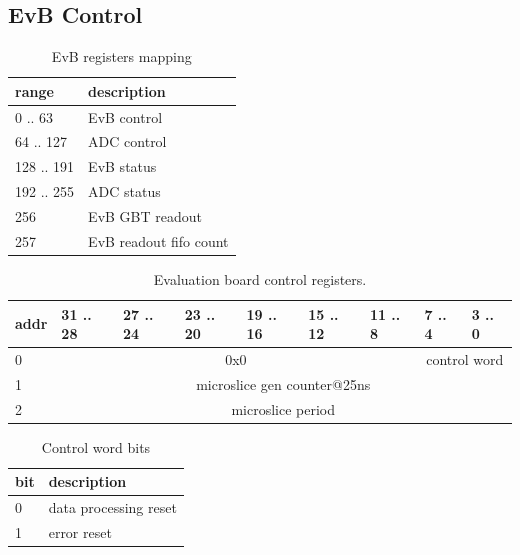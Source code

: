 \documentclass{article}
\begin{document}
\subsection{EvB Control}

\begin{table}[H]
\centering
\begin{tabular}{| l | l |}
\hline
range & description \\ \hline
0 .. 63 & EvB control \\ \hline
64 .. 127 & ADC control \\ \hline
128 .. 191 & EvB status \\ \hline
192 .. 255 & ADC status \\ \hline
256 & EvB GBT readout \\ \hline
257 & EvB readout fifo count \\ \hline
\end{tabular}
\caption{EvB registers mapping\label{tab6}}
\end{table}

\begin{table}[H]
\centering
\begin{tabular}{| l | l | l | l | l | l | l | l | l |}
\hline
addr & 31 .. 28 & 27 .. 24 & 23 .. 20 & 19 .. 16 & 15 .. 12 & 11 .. 8 & 7 .. 4 & 3 .. 0 \\ \hline
0 & \multicolumn{6}{c|}{0x0}  & \multicolumn{2}{c|}{control word} \\ \hline
1 & \multicolumn{8}{c|}{microslice gen counter@25ns}  \\ \hline
2 & \multicolumn{8}{c|}{microslice period}  \\ \hline
\end{tabular}
\caption{Evaluation board control registers.\label{tab11}}
\end{table}

\begin{table}[H]
\centering
\begin{tabular}{| l | l |}
\hline
bit & description \\ \hline
0 & data processing reset \\ \hline
1 & error reset \\ \hline
\end{tabular}
\caption{Control word bits\label{tab12}}
\end{table}
\end{document}
